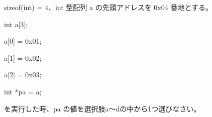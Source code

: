 sizeof(int) = 4、int 型配列 a の先頭アドレスを 0x04 番地とする。\par
\noindent int a[3]; \par
\noindent a[0] = 0x01; \par
\noindent a[1] = 0x02; \par
\noindent a[2] = 0x03; \par
\noindent int *pa = a; \par
を実行した時、pa の値を選択肢a〜dの中から1つ選びなさい。
